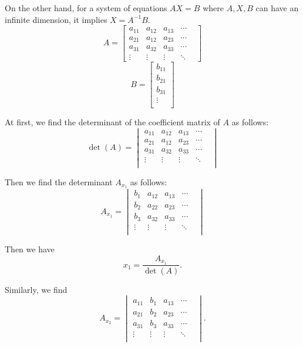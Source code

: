 On the other hand, for a system of equations $AX = B$ where $A, X, B$ can have an infinite dimension, it implies $X = A^{-1}B$.
\[
A = \begin{bmatrix}
    a_{11} & a_{12} & a_{13} & \cdots &  \\
    a_{21} & a_{12} & a_{23} & \cdots &  \\
    a_{31} & a_{32} & a_{33} & \cdots &  \\
    \vdots & \vdots & \vdots & \ddots &  
 \end{bmatrix}
\]
\[
B = \begin{bmatrix}
    b_{11} \\
    b_{21} \\
    b_{31} \\
    \vdots  \\
\end{bmatrix}
\]


At first, we find the determinant of the coefficient matrix of $A$ as follows:
\[
{\operatorname{det } (A)} = \begin{vmatrix}
    a_{11} & a_{12} & a_{13} & \cdots &  \\
    a_{21} & a_{12} & a_{23} & \cdots &  \\
    a_{31} & a_{32} & a_{33} & \cdots &  \\
    \vdots & \vdots & \vdots & \ddots &  \\
\end{vmatrix}
\]

Then we find the determinant $A_{x_1}$ as follows:
\[
     A_{x_1} = \begin{vmatrix}
    b_1 & a_{12} & a_{13} & \cdots &  \\
    b_2 & a_{22} & a_{23} & \cdots &  \\
    b_3 & a_{32} & a_{33} & \cdots &  \\
    \vdots & \vdots & \vdots & \ddots &  \\
\end{vmatrix}
\]

Then we have 
\[
x_1 = \frac{ A_{x_1}}{\operatorname{det } (A)}.
\]

Similarly, we find
\[
     A_{x_2} = \begin{vmatrix}
    a_{11} & b_1 & a_{13} & \cdots &  \\
    a_{21} & b_2 & a_{23} & \cdots &  \\
    a_{31} & b_3 & a_{33} & \cdots &  \\
    \vdots & \vdots & \vdots & \ddots &  \\
\end{vmatrix}.
\]

